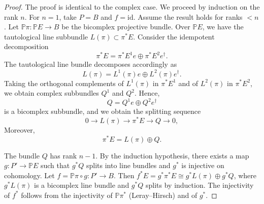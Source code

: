 \documentclass[10pt,a4paper]{amsart}
\renewcommand{\P}{\mathbb{P}}
\begin{document}
\begin{proof}
    The proof is identical to the complex case. We proceed by induction on the rank $n$. For $n=1$, take $P=B$ and $f=\mathrm{id}$. Assume the result holds for ranks $< n$. Let $\P\pi: \P E \to B$ be the bicomplex projective bundle. Over $\P E$, we have the tautological line subbundle $L(\pi) \subset \pi^*E$. Consider the idempotent decomposition
\begin{equation*}
\pi^*E=\pi^*E^1e\oplus\pi^*E^2e^\dagger.
\end{equation*}
The tautological line bundle decomposes accordingly as
\begin{equation*}
L(\pi)=L^1(\pi)e\oplus L^2(\pi)e^\dagger.
\end{equation*}
Taking the orthogonal complements of $L^1(\pi)$ in $\pi^*E^1$ and of $L^2(\pi)$ in $\pi^*E^2$, we obtain complex subbundles $Q^1$ and $Q^2$. Hence,
\begin{equation*}
Q=Q^1e\oplus Q^2e^\dagger
\end{equation*}
is a bicomplex subbundle, and we obtain the splitting sequence
\begin{equation*}
0\longrightarrow L(\pi)\longrightarrow \pi^*E\longrightarrow Q\longrightarrow 0,
\end{equation*}
Moreover,
\begin{equation*}
\pi^*E=L(\pi)\oplus Q.
\end{equation*}

The bundle $Q$ has rank $n-1$. By the induction hypothesis, there exists a map $g: P' \to \P E$ such that $g^*Q$ splits into line bundles and $g^*$ is injective on cohomology. Let $f = \P\pi \circ g: P' \to B$. Then $f^*E = g^*\pi^*E \cong g^*L(\pi) \oplus g^*Q$, where $g^*L(\pi)$ is a bicomplex line bundle and $g^*Q$ splits by induction. The injectivity of $f^*$ follows from the injectivity of $\P\pi^*$ (Leray--Hirsch) and of $g^*$.
\end{proof}
\end{document}

